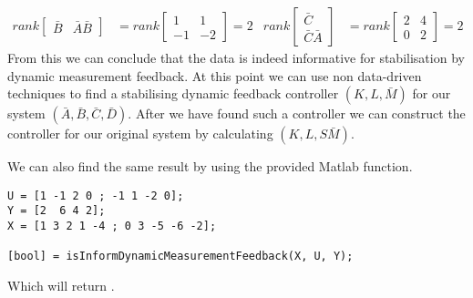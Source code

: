 \begin{align*}
rank\begin{bmatrix} \bar{B}&\bar{A}\bar{B} \end{bmatrix} &= rank\begin{bmatrix} 1&1\\-1&-2 \end{bmatrix} =2 &
rank\begin{bmatrix} \bar{C}\\\bar{C}\bar{A} \end{bmatrix} &= rank\begin{bmatrix} 2&4\\0&2 \end{bmatrix} = 2
\end{align*}
From this we can conclude that the data is indeed informative for stabilisation by dynamic measurement feedback. At this point we can use non data-driven techniques to find a stabilising dynamic feedback controller $(K,L,\bar{M})$ for our system $(\bar{A},\bar{B},\bar{C},\bar{D})$. After we have found such a controller we can construct the controller for our original system by calculating $(K,L,S\bar{M})$.

We can also find the same result by using the provided Matlab function.
\begin{lstlisting}
U = [1 -1 2 0 ; -1 1 -2 0];
Y = [2  6 4 2];
X = [1 3 2 1 -4 ; 0 3 -5 -6 -2];

[bool] = isInformDynamicMeasurementFeedback(X, U, Y);
\end{lstlisting}
Which will return \mon{[ 1 ]}.








